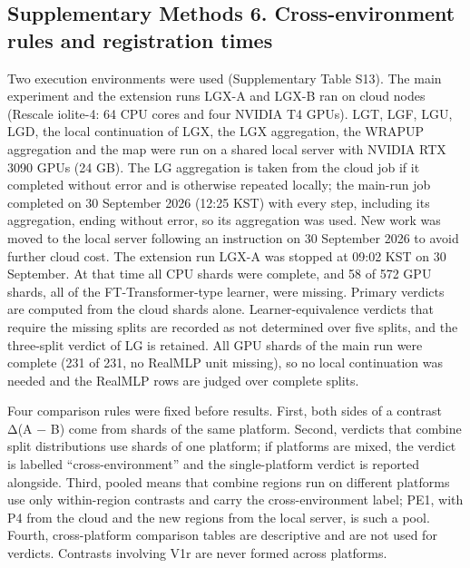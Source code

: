 \subsection*{Supplementary Methods 6. Cross-environment rules and registration times}

Two execution environments were used (Supplementary Table S13). The main experiment and the extension runs LGX-A and LGX-B ran on cloud nodes (Rescale iolite-4: 64 CPU cores and four NVIDIA T4 GPUs). LGT, LGF, LGU, LGD, the local continuation of LGX, the LGX aggregation, the WRAPUP aggregation and the map were run on a shared local server with NVIDIA RTX 3090 GPUs (24 GB). The LG aggregation is taken from the cloud job if it completed without error and is otherwise repeated locally; the main-run job completed on 30 September 2026 (12:25 KST) with every step, including its aggregation, ending without error, so its aggregation was used. New work was moved to the local server following an instruction on 30 September 2026 to avoid further cloud cost. The extension run LGX-A was stopped at 09:02 KST on 30 September. At that time all CPU shards were complete, and 58 of 572 GPU shards, all of the FT-Transformer-type learner, were missing. Primary verdicts are computed from the cloud shards alone. Learner-equivalence verdicts that require the missing splits are recorded as not determined over five splits, and the three-split verdict of LG is retained. All GPU shards of the main run were complete (231 of 231, no RealMLP unit missing), so no local continuation was needed and the RealMLP rows are judged over complete splits.

Four comparison rules were fixed before results. First, both sides of a contrast Δ(A − B) come from shards of the same platform. Second, verdicts that combine split distributions use shards of one platform; if platforms are mixed, the verdict is labelled ``cross-environment'' and the single-platform verdict is reported alongside. Third, pooled means that combine regions run on different platforms use only within-region contrasts and carry the cross-environment label; PE1, with P4 from the cloud and the new regions from the local server, is such a pool. Fourth, cross-platform comparison tables are descriptive and are not used for verdicts. Contrasts involving V1r are never formed across platforms.

